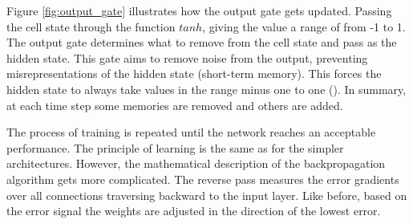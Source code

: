 Figure \ref{fig:output_gate} illustrates how the output gate gets updated. Passing the cell state through the function $tanh$, giving the value a range of from -1 to 1. The output gate determines what to remove from the cell state and pass as the hidden state. This gate aims to remove noise from the output, preventing misrepresentations of the hidden state (short-term memory). This forces the hidden state to always take values in the range minus one to one (\cite{Hochreiter1997LongMemory}).  In summary, at each time step some memories are removed and others are added. 

The process of training is repeated until the network reaches an acceptable performance. The principle of learning is the same as for the simpler architectures. However, the mathematical description of the backpropagation algorithm gets more complicated. The reverse pass measures the error gradients over all connections traversing backward to the input layer. Like before, based on the error signal the weights are adjusted in the direction of the lowest error.


